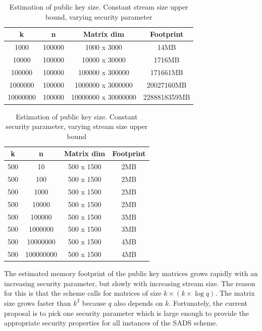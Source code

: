\documentclass[11pt, letterpaper, oneside]{article}
\begin{document}
	\begin{table}[h]
	\centering

		\begin{tabular} { c | c | c | c}

		k & n & Matrix dim & Footprint\\ \hline
		1000&100000&1000 x 3000&14MB\\
		10000&100000&10000 x 30000&1716MB\\
		100000&100000&100000 x 300000&171661MB\\
		1000000&100000&1000000 x 3000000&20027160MB\\
		10000000&100000&10000000 x 30000000&2288818359MB\\
		\end{tabular}

	\caption{Estimation of public key size.  Constant stream size upper bound, varying security parameter }
	\label{tab:pub-key-k}
	\end{table}


	\begin{table}[h]
	\centering
		\begin{tabular}{ c | c | c | c}
		k & n & Matrix dim & Footprint\\ \hline
		500&10&500 x 1500&2MB\\
		500&100&500 x 1500&2MB\\
		500&1000&500 x 1500&2MB\\
		500&10000&500 x 1500&2MB\\
		500&100000&500 x 1500&3MB\\
		500&1000000&500 x 1500&3MB\\
		500&10000000&500 x 1500&4MB\\
		500&100000000&500 x 1500&4MB\\

		\end{tabular}
	\caption{ Estimation of public key size. Constant security parameter, varying stream size upper bound }
	\label{tab:pub-key-n}
	\end{table}


	The estimated memory footprint of the public key matrices grows rapidly with an increasing security parameter, but slowly with increasing stream size.
	The reason for this is that the scheme calls for matrices of size $k  \times ( k \times \log q )$.
	The matrix size grows faster than $k^2$ because $q$ also depends on $k$.
	Fortunately, the current proposal is to pick one security parameter which is large enough to provide the appropriate security properties for all instances of the SADS scheme.
\end{document}

